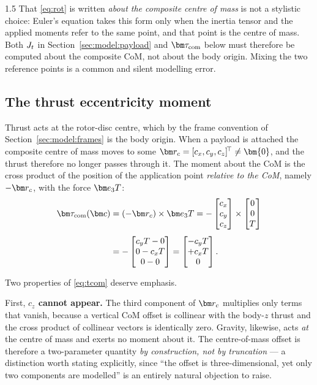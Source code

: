 \begin{spacing}{1.5}
That \eqref{eq:rot} is written \emph{about the composite centre of mass}
is not a stylistic choice: Euler's equation takes this form only when the
inertia tensor and the applied moments refer to the same point, and that
point is the centre of mass. Both $J_t$ in Section~\ref{sec:model:payload}
and $\tcom$ below must therefore be computed about the composite CoM, not
about the body origin. Mixing the two reference points is a common and
silent modelling error.

\subsection{The thrust eccentricity moment}\label{sec:model:tcom}

Thrust acts at the rotor-disc centre, which by the frame convention of
Section~\ref{sec:model:frames} is the body origin. When a payload is
attached the composite centre of mass moves to some
$\rc = [c_x, c_y, c_z]^{\!\top} \neq \bm{0}$, and the thrust therefore no
longer passes through it. The moment about the CoM is the cross product
of the position of the application point \emph{relative to the CoM},
namely $-\rc$, with the force $\ev T$:
\begin{align}
\tcom(\cvec) &= (-\rc) \times \ev T
= -\begin{bmatrix} c_x \\ c_y \\ c_z \end{bmatrix}
\times \begin{bmatrix} 0 \\ 0 \\ T \end{bmatrix} \nonumber \\[4pt]
&= -\begin{bmatrix} c_y T - 0 \\ 0 - c_x T \\ 0 - 0 \end{bmatrix}
= \begin{bmatrix} -c_y T \\ +c_x T \\ 0 \end{bmatrix}.
\label{eq:tcom}
\end{align}

Two properties of \eqref{eq:tcom} deserve emphasis.

First, \textbf{$c_z$ cannot appear.} The third component of $\rc$
multiplies only terms that vanish, because a vertical CoM offset is
collinear with the body-$z$ thrust and the cross product of collinear
vectors is identically zero. Gravity, likewise, acts \emph{at} the centre
of mass and exerts no moment about it. The centre-of-mass offset is
therefore a two-parameter quantity \emph{by construction, not by
truncation} --- a distinction worth stating explicitly, since ``the
offset is three-dimensional, yet only two components are modelled'' is an
entirely natural objection to raise.


\end{spacing}
